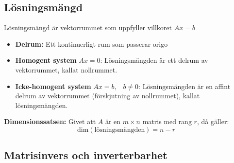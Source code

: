 \documentclass[12pt,a4paper]{article}
\begin{document}
\subsection{Lösningsmängd}
Lösningsmängd är vektorrummet som uppfyller villkoret $Ax = b$ 
\vspace{10pt}
\begin{itemize}
    \item \textbf{Delrum:} Ett kontinuerligt rum som passerar origo
    \item \textbf{Homogent system} $Ax = 0$: Lösningsmängden är ett delrum av vektorrummet, kallat nollrummet.
    \item \textbf{Icke-homogent system} $Ax = b,\hspace{10pt} b \neq 0$: Lösningsmängden är en affint delrum av vektorrummet (förskjutning av nollrummet), kallat lösningsmängden.
\end{itemize}
\textbf{Dimensionssatsen:}
Givet att $A$ är en $m \times n$ matris med rang $r$, då gäller:
\[
\text{dim}(\text{lösningsmängden}) = n - r
\]

\subsection{Matrisinvers och inverterbarhet}
\end{document}
